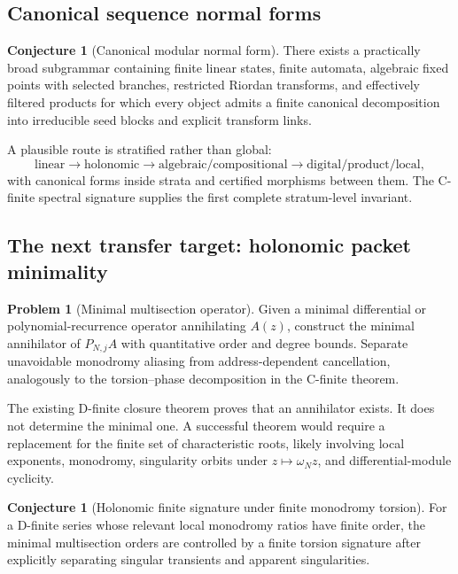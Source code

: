 \documentclass[11pt]{article}
\theoremstyle{definition}\newtheorem{definition}[theorem]{Definition}\newtheorem{example}[theorem]{Example}\newtheorem{construction}[theorem]{Construction}\newtheorem{algorithm}[theorem]{Algorithm}\newtheorem{conjecture}[theorem]{Conjecture}\newtheorem{problem}[theorem]{Problem}
\theoremstyle{remark}\newtheorem{remark}[theorem]{Remark}\newtheorem{boundary}[theorem]{Boundary}\newtheorem{certificate}[theorem]{Computational Certificate}\newtheorem{classical}[theorem]{Classical Input}\newtheorem{principle}[theorem]{Structural Principle}
\begin{document}
\subsection{Canonical sequence normal forms}
\begin{conjecture}[Canonical modular normal form]
There exists a practically broad subgrammar containing finite linear states, finite automata, algebraic fixed points with selected branches, restricted Riordan transforms, and effectively filtered products for which every object admits a finite canonical decomposition into irreducible seed blocks and explicit transform links.
\end{conjecture}

A plausible route is stratified rather than global:
\[
 \text{linear}\to\text{holonomic}\to\text{algebraic/compositional}\to
 \text{digital/product/local},
\]
with canonical forms inside strata and certified morphisms between them.  The C-finite spectral signature supplies the first complete stratum-level invariant.

\subsection{The next transfer target: holonomic packet minimality}
\begin{problem}[Minimal multisection operator]
Given a minimal differential or polynomial-recurrence operator annihilating $A(z)$, construct the minimal annihilator of $P_{N,j}A$ with quantitative order and degree bounds.  Separate unavoidable monodromy aliasing from address-dependent cancellation, analogously to the torsion--phase decomposition in the C-finite theorem.
\end{problem}

The existing D-finite closure theorem proves that an annihilator exists.  It does not determine the minimal one.  A successful theorem would require a replacement for the finite set of characteristic roots, likely involving local exponents, monodromy, singularity orbits under $z\mapsto\omega_Nz$, and differential-module cyclicity.

\begin{conjecture}[Holonomic finite signature under finite monodromy torsion]
For a D-finite series whose relevant local monodromy ratios have finite order, the minimal multisection orders are controlled by a finite torsion signature after explicitly separating singular transients and apparent singularities.
\end{conjecture}
\end{document}
